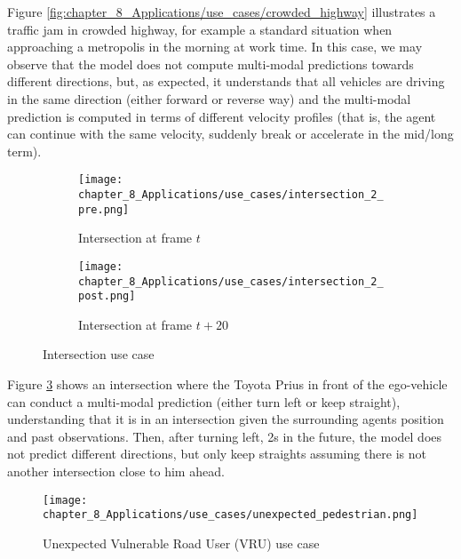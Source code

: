 Figure \ref{fig:chapter_8_Applications/use_cases/crowded_highway} illustrates a traffic jam in crowded highway, for example a standard situation when approaching a metropolis in the morning at work time. In this case, we may observe that the model does not compute multi-modal predictions towards different directions, but, as expected, it understands that all vehicles are driving in the same direction (either forward or reverse way) and the multi-modal prediction is computed in terms of different velocity profiles (that is, the agent can continue with the same velocity, suddenly break or accelerate in the mid/long term).

\begin{figure}[!h]
	\begin{subfigure}{\textwidth}
		\texttt{[image: chapter\_8\_Applications/use\_cases/intersection\_2\_pre.png]}
		\label{subfig:chapter_8_Applications/use_cases/intersection_2_pre}
		\caption{Intersection at frame $t$}
	\end{subfigure}
	\begin{subfigure}{\textwidth}
		\texttt{[image: chapter\_8\_Applications/use\_cases/intersection\_2\_post.png]}
		\label{subfig:chapter_8_Applications/use_cases/intersection_2_post}
		\caption{Intersection at frame $t+20$}
	\end{subfigure}
	
	\caption{Intersection use case}
	\label{fig:chapter_8_Applications/use_cases/intersection}
\end{figure}

Figure \ref{fig:chapter_8_Applications/use_cases/intersection} shows an intersection where the Toyota Prius in front of the ego-vehicle can conduct a multi-modal prediction (either turn left or keep straight), understanding that it is in an intersection given the surrounding agents position and past observations. Then, after turning left, 2s in the future, the model does not predict different directions, but only keep straights assuming there is not another intersection close to him ahead.

\begin{figure}[!h]
	\centering
	\texttt{[image: chapter\_8\_Applications/use\_cases/unexpected\_pedestrian.png]}
	\caption{Unexpected Vulnerable Road User (VRU) use case}
	\label{fig:chapter_8_Applications/use_cases/unexpected_pedestrian}
\end{figure}

